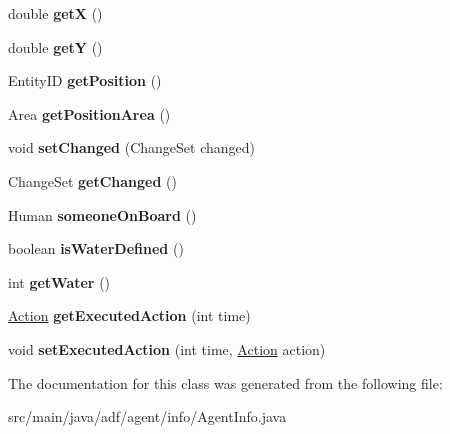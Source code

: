 \begin{DoxyCompactItemize}
double {\bfseries getX} ()
\item 
\hypertarget{classadf_1_1agent_1_1info_1_1AgentInfo_a3c368a98edf3219b66b03fcce86b7eeb}{}\label{classadf_1_1agent_1_1info_1_1AgentInfo_a3c368a98edf3219b66b03fcce86b7eeb} 
double {\bfseries getY} ()
\item 
\hypertarget{classadf_1_1agent_1_1info_1_1AgentInfo_a749267c8b12d5e206345f7b754925c16}{}\label{classadf_1_1agent_1_1info_1_1AgentInfo_a749267c8b12d5e206345f7b754925c16} 
Entity\+ID {\bfseries get\+Position} ()
\item 
\hypertarget{classadf_1_1agent_1_1info_1_1AgentInfo_a8e1f8015e29c723f977cfa64eee9db6b}{}\label{classadf_1_1agent_1_1info_1_1AgentInfo_a8e1f8015e29c723f977cfa64eee9db6b} 
Area {\bfseries get\+Position\+Area} ()
\item 
\hypertarget{classadf_1_1agent_1_1info_1_1AgentInfo_a2df7c9be9a65d6796952b74860fe655e}{}\label{classadf_1_1agent_1_1info_1_1AgentInfo_a2df7c9be9a65d6796952b74860fe655e} 
void {\bfseries set\+Changed} (Change\+Set changed)
\item 
\hypertarget{classadf_1_1agent_1_1info_1_1AgentInfo_a8ced695c70693675d0d1b65fc2bb5798}{}\label{classadf_1_1agent_1_1info_1_1AgentInfo_a8ced695c70693675d0d1b65fc2bb5798} 
Change\+Set {\bfseries get\+Changed} ()
\item 
\hypertarget{classadf_1_1agent_1_1info_1_1AgentInfo_abe66f0a428ce365f3c38504e7ec89046}{}\label{classadf_1_1agent_1_1info_1_1AgentInfo_abe66f0a428ce365f3c38504e7ec89046} 
Human {\bfseries someone\+On\+Board} ()
\item 
\hypertarget{classadf_1_1agent_1_1info_1_1AgentInfo_a3413ebc871d37b53ba0de67581605058}{}\label{classadf_1_1agent_1_1info_1_1AgentInfo_a3413ebc871d37b53ba0de67581605058} 
boolean {\bfseries is\+Water\+Defined} ()
\item 
\hypertarget{classadf_1_1agent_1_1info_1_1AgentInfo_adb5d3d2ccf79c87a8f266425da451a71}{}\label{classadf_1_1agent_1_1info_1_1AgentInfo_adb5d3d2ccf79c87a8f266425da451a71} 
int {\bfseries get\+Water} ()
\item 
\hypertarget{classadf_1_1agent_1_1info_1_1AgentInfo_ab0623e4d050cd2581c694083aeac18a0}{}\label{classadf_1_1agent_1_1info_1_1AgentInfo_ab0623e4d050cd2581c694083aeac18a0} 
\hyperlink{classadf_1_1agent_1_1action_1_1Action}{Action} {\bfseries get\+Executed\+Action} (int time)
\item 
\hypertarget{classadf_1_1agent_1_1info_1_1AgentInfo_ae384e6762b685e108a11fa70cc652ff5}{}\label{classadf_1_1agent_1_1info_1_1AgentInfo_ae384e6762b685e108a11fa70cc652ff5} 
void {\bfseries set\+Executed\+Action} (int time, \hyperlink{classadf_1_1agent_1_1action_1_1Action}{Action} action)
\end{DoxyCompactItemize}


The documentation for this class was generated from the following file\+:\begin{DoxyCompactItemize}
\item 
src/main/java/adf/agent/info/Agent\+Info.\+java\end{DoxyCompactItemize}
